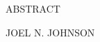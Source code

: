 {}

\begin{center}
    \large
    ABSTRACT

    \large
    \dissertationTitle{}

    \large
    \vspace{2mm}
    JOEL N. JOHNSON

\end{center}

\noindent \lipsum[1-2]
